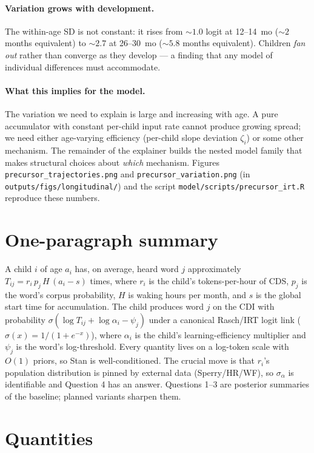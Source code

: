 \documentclass[11pt]{article}
\newcommand{\sigmoid}{\sigma}
\begin{document}
\paragraph{Variation grows with development.} The within-age SD is
not constant: it rises from \(\sim 1.0\) logit at 12--14~mo
(\(\sim 2\) months equivalent) to \(\sim 2.7\) at 26--30~mo
(\(\sim 5.8\) months equivalent). Children \emph{fan out} rather
than converge as they develop — a finding that any model of
individual differences must accommodate.

\paragraph{What this implies for the model.} The variation we need
to explain is large and increasing with age. A pure accumulator
with constant per-child input rate cannot produce growing spread; we
need either age-varying efficiency (per-child slope deviation
\(\zeta_i\)) or some other mechanism. The remainder of the
explainer builds the nested model family that makes structural
choices about \emph{which} mechanism. Figures
\texttt{precursor\_trajectories.png} and
\texttt{precursor\_variation.png} (in
\texttt{outputs/figs/longitudinal/}) and the script
\texttt{model/scripts/precursor\_irt.R} reproduce these numbers.

\section{One-paragraph summary}

A child \(i\) of age \(a_i\) has, on average, heard word \(j\) approximately
\(T_{ij} = r_i\,p_j\,H\,(a_i - s)\) times, where \(r_i\) is the child's
tokens-per-hour of CDS, \(p_j\) is the word's corpus probability, \(H\) is
waking hours per month, and \(s\) is the global start time for
accumulation. The child produces word \(j\) on the CDI with probability
\(\sigmoid(\log T_{ij} + \log \alpha_i - \psi_j)\) under a canonical
Rasch/IRT logit link (\(\sigmoid(x) = 1/(1+e^{-x})\)), where \(\alpha_i\)
is the child's learning-efficiency multiplier and \(\psi_j\) is the
word's log-threshold. Every quantity lives on a log-token scale with
\(O(1)\) priors, so Stan is well-conditioned. The crucial move is that
\(r_i\)'s population distribution is pinned by external data
(Sperry/HR/WF), so \(\sigma_\alpha\) is identifiable and Question 4 has an
answer. Questions 1--3 are posterior summaries of the baseline;
planned variants sharpen them.

\section{Quantities}
\end{document}
